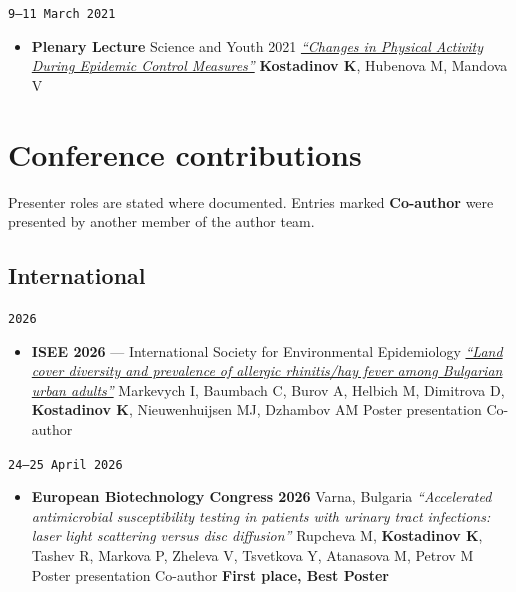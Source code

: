 \documentclass[
  10.5pt,
  a4paper,
  DIV=11,
  numbers=noendperiod]{scrartcl}
\providecommand{\tightlist}{%
  \setlength{\itemsep}{0pt}\setlength{\parskip}{0pt}}
\let\oldtexttt\texttt
\renewcommand{\texttt}[1]{{\color{cvbronze}\small\oldtexttt{#1}}}
\begin{document}
\texttt{9–11\ March\ 2021}

\begin{itemize}
\tightlist
\item
  \textbf{Plenary Lecture} \textbar{} Science and Youth 2021 \textbar{}
  \emph{\href{https://www.asclepius.bg/images/nm2021/\%D0\%9F\%D0\%A0\%D0\%9E\%D0\%93\%D0\%A0\%D0\%90\%D0\%9C\%D0\%90-\%D0\%9D\%D0\%90\%D0\%A3\%D0\%9A\%D0\%90-\%D0\%98-\%D0\%9C\%D0\%9B\%D0\%90\%D0\%94\%D0\%9E\%D0\%A1\%D0\%A2-2021.pdf}{``Changes
  in Physical Activity During Epidemic Control Measures''}} \textbar{}
  \textbf{Kostadinov K}, Hubenova M, Mandova V
\end{itemize}

\section{Conference contributions}\label{conference-contributions}

Presenter roles are stated where documented. Entries marked
\textbf{Co-author} were presented by another member of the author team.

\subsection{International}\label{international}

\texttt{2026}

\begin{itemize}
\tightlist
\item
  \textbf{ISEE 2026} --- International Society for Environmental
  Epidemiology \textbar{}
  \emph{\href{https://doi.org/10.1097/01.ee9.0001298268.23166.47}{``Land
  cover diversity and prevalence of allergic rhinitis/hay fever among
  Bulgarian urban adults''}} \textbar{} Markevych I, Baumbach C, Burov
  A, Helbich M, Dimitrova D, \textbf{Kostadinov K}, Nieuwenhuijsen MJ,
  Dzhambov AM \textbar{} Poster presentation \textbar{} Co-author
\end{itemize}

\texttt{24–25\ April\ 2026}

\begin{itemize}
\tightlist
\item
  \textbf{European Biotechnology Congress 2026} \textbar{} Varna,
  Bulgaria \textbar{} \emph{``Accelerated antimicrobial susceptibility
  testing in patients with urinary tract infections: laser light
  scattering versus disc diffusion''} \textbar{} Rupcheva M,
  \textbf{Kostadinov K}, Tashev R, Markova P, Zheleva V, Tsvetkova Y,
  Atanasova M, Petrov M \textbar{} Poster presentation \textbar{}
  Co-author \textbar{} \textbf{First place, Best Poster}
\end{itemize}
\end{document}
